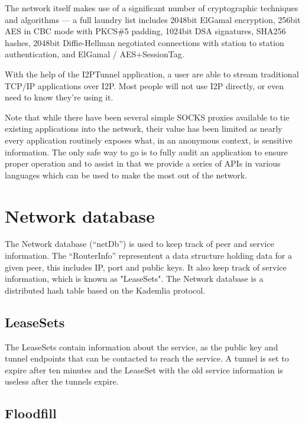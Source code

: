 \documentclass[a4paper,twocolumn,12pt]{article}
\begin{document}
The network itself makes use of a significant number of cryptographic techniques and
algorithms --- a full laundry list includes 2048bit ElGamal\cite{DBLP:journals/tit/Elgamal85}
encryption, 256bit AES\cite{books/sp/DaemenR02} in CBC mode with PKCS\#5 padding, 1024bit 
DSA\cite{2000--dss} signatures, SHA256 hashes, 2048bit Diffie-Hellman negotiated connections with 
station to station authentication, and ElGamal / AES+SessionTag.

\vspace{2 em}

With the help of the I2PTunnel application, a user are able to stream
traditional TCP/IP applications over I2P. Most people will not use I2P
directly, or even need to know they're using it.

Note that while there have been several simple SOCKS proxies available to tie
existing applications into the network, their value has been limited as nearly
every application routinely exposes what, in an anonymous context, is sensitive
information. The only safe way to go is to fully audit an application to ensure
proper operation and to assist in that we provide a series of APIs in various
languages which can be used to make the most out of the network.

\section{Network database}

The Network database (``netDb'') is used to keep track of peer and service
information. The ``RouterInfo'' representent a data structure holding data for a
given peer, this includes IP, port and public keys. It also keep track of
service information, which is known as "LeaseSets". The Network database is a
distributed hash table based on the Kademlia\cite{Maymounkov:2002:KPI:646334.687801} protocol.

\subsection{LeaseSets}

The LeaseSets contain information about the service, as the public key and
tunnel endpoints that can be contacted to reach the service. A tunnel is set to
expire after ten minutes and the LeaseSet with the old service information is
useless after the tunnels expire.

\subsection{Floodfill}
\end{document}
